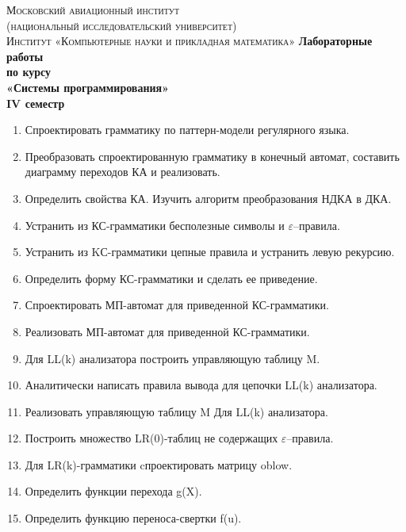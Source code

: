 \documentclass[a4paper,10pt]{article}
\begin{document}
	\begin{titlepage}
		\begin{center}
			\textsc{Московский авиационный институт \\[2mm]
				(национальный исследовательский университет) 
				\textcolor{blue}{\noindent\makebox[\linewidth]{\rule{\textwidth}{0.4pt}}}\\[5mm]
				Институт «Компьютерные науки и прикладная математика»}
			\vfill
			\textbf{Лабораторные работы\\[2mm]
				по курсу \\[3mm]
				«Системы программирования»\\[2mm]
				IV семестр
				\\[5mm]
			}
		\end{center}
		\begin{enumerate}
			\item Спроектировать грамматику по паттерн-модели регулярного языка.
			\item Преобразовать спроектированную грамматику в конечный автомат, составить диаграмму переходов КА и  реализовать.
			\item Определить свойства КА. Изучить  алгоритм преобразования НДКА в ДКА. \\[1mm]
			\item Устранить из КС-грамматики  бесполезные символы и $ \varepsilon $–правила.
			\item Устранить из KС-грамматики цепные правила и устранить левую рекурсию.
			\item Определить форму КС-грамматики и сделать ее приведение.
			\item Спроектировать МП-автомат для приведенной КС-грамматики.
			\item Реализовать МП-автомат для приведенной КС-грамматики. \\[1mm]
			\item Для LL(k) анализатора построить управляющую таблицу M.
			\item Аналитически написать правила вывода для цепочки LL(k) анализатора.
			\item Реализовать управляющую таблицу M Для LL(k) анализатора. \\[1mm]
			\item Построить множество LR(0)-таблиц не содержащих $ \varepsilon $–правила.
			\item Для LR(k)-грамматики cпроектировать матрицу oblow.
			\item Определить функции перехода g(X).
			\item Определить функцию переноса-свертки f(u).

\end{enumerate}
\end{titlepage}
\end{document}
